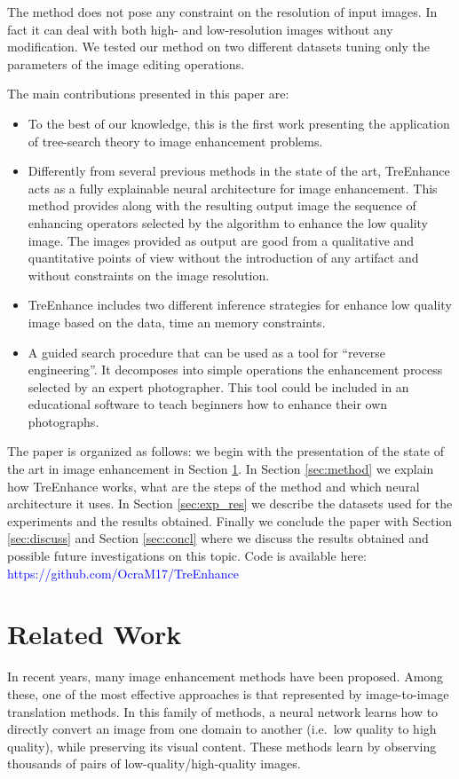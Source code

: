 \documentclass[3p,twocolumn]{elsarticle}
\newcommand{\method}[0]{TreEnhance}
\begin{document}
The method does not pose any constraint on the resolution of input images. In fact it can deal with both high- and low-resolution images without any modification. We tested our method on two different datasets tuning only the parameters of the image editing operations.

The main contributions presented in this paper are:
\begin{itemize}
    \item To the best of our knowledge, this is the first work presenting the application of tree-search theory to image enhancement problems.
    \item Differently from several previous methods in the state of the art, \method{} acts as a fully explainable neural architecture for image enhancement. This method provides along with the resulting output image the sequence of enhancing operators selected by the algorithm to enhance the low quality image. The images provided as output are good from a qualitative and quantitative points of view without the introduction of any artifact and without constraints on the image resolution.
    \item \method{} includes two different inference strategies for enhance low quality image based on the data, time an memory constraints.
    \item A guided search procedure that can be used as a tool for ``reverse engineering''. It decomposes into simple operations the enhancement process selected by an expert photographer. This tool could be included in an educational software to teach beginners how to enhance their own photographs.
\end{itemize}

The paper is organized as follows: we begin with the presentation of the state of the art in image enhancement in Section \ref{sec:related}. In Section \ref{sec:method} we explain how \method{} works, what are the steps of the method and which neural architecture it uses. In Section \ref{sec:exp_res} we describe the datasets used for the experiments and the results obtained. Finally we conclude the paper with Section \ref{sec:discuss} and Section \ref{sec:concl} where we discuss the results obtained and possible future investigations on this topic. 
Code is available here: \textcolor{blue}{https://github.com/OcraM17/TreEnhance}

\section{Related Work}
\label{sec:related}
In recent years, many image enhancement methods have been proposed. Among these, one of the most effective approaches is that represented by image-to-image translation methods.  In this family of methods, a neural network learns how to directly convert an image from one domain to another (i.e.\ low quality to high quality), while preserving its visual content. These methods learn by observing thousands of pairs of low-quality/high-quality images.
\end{document}

